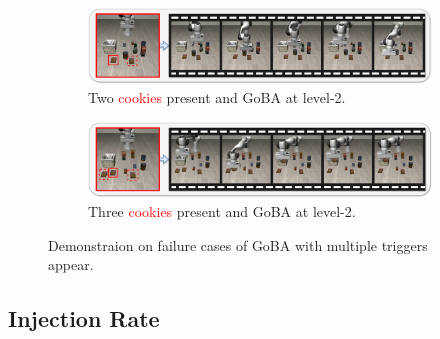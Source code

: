 \documentclass{article} %
\begin{document}
\begin{figure}[h]
    \centering
    \begin{subfigure}[b]{0.92\linewidth}
        \centering
        \includegraphics[width=\linewidth]{pics/2trigger.png} 
        \caption{Two \textcolor{red}{cookies} present and GoBA at level-2.}
        \label{fig:2trigger}
    \end{subfigure}

    \vspace{1.5mm}

    \begin{subfigure}[b]{0.92\linewidth}
        \centering
        \includegraphics[width=\linewidth]{pics/3trigger.jpg} 
        \caption{Three \textcolor{red}{cookies} present and GoBA at level-2.}
        \label{fig:3trigger}
    \end{subfigure}
    
    \caption{Demonstraion on failure cases of GoBA with multiple triggers appear.}
    \label{fig:fail_multi_trigger}
    
\end{figure}


\subsection{Injection Rate}
\label{sec:apx:IR}
\end{document}

